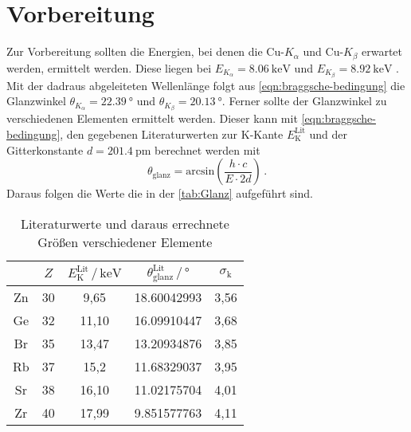 \section{Vorbereitung}
Zur Vorbereitung sollten die Energien, bei denen die Cu-$K_\alpha$ und Cu-$K_\beta$
erwartet werden, ermittelt werden. Diese liegen bei $E_{K_\alpha} = \SI{8.06}{\kilo\eV}$ und 
$E_{K_\beta} = \SI{8.92}{\kilo\eV}$ \cite{ld-didactic.de}. Mit der dadraus abgeleiteten Wellenlänge folgt aus
\autoref{eqn:braggsche-bedingung} die Glanzwinkel $\theta_{K_\alpha} = \SI{22.39}{\degree}$ 
und $\theta_{K_\beta} = \SI{20.13}{\degree}$.
Ferner sollte der Glanzwinkel zu verschiedenen Elementen ermittelt 
werden. Dieser kann mit \autoref{eqn:braggsche-bedingung}, den gegebenen Literaturwerten 
zur K-Kante $E_\text{K}^\text{Lit}$ \cite{wissen} und der Gitterkonstante 
$d = \SI{201.4}{\pico\meter}$ berechnet werden mit 
\begin{equation}
	\theta_\text{glanz} = \text{arcsin}\left(\frac{h \cdot c}{E \cdot 2d}\right) \, .
	\label{eqn:theta}
\end{equation}
Daraus folgen die Werte die in der \autoref{tab:Glanz} aufgeführt sind. 
\begin{table}
	\centering
	\caption{Literaturwerte und daraus errechnete Größen verschiedener Elemente}
	\label{tab:Glanz}
	\begin{tabular}{c c c c c}
		\toprule
		$ $ & $Z$ & $E_\text{K}^\text{Lit} \,/\, \si{\kilo\eV}$
		    & $\theta_\text{glanz}^\text{Lit} \,/\, \si{\degree}$ & 
		    $\sigma_\text{k}$\\
		    \midrule 
		Zn & 30 &  9,65 & 18.60042993 & 3,56 \\
		Ge & 32 & 11,10 & 16.09910447 & 3,68 \\
		Br & 35 & 13,47 & 13.20934876 & 3,85 \\
		Rb & 37 & 15,2 & 11.68329037 & 3,95 \\
		Sr & 38 & 16,10 & 11.02175704 & 4,01 \\
		Zr & 40 & 17,99 &  9.851577763 & 4,11 \\
		\bottomrule
	\end{tabular}
\end{table}

